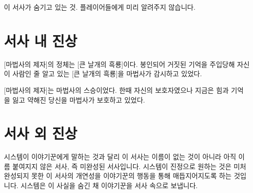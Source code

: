 \documentclass{report}
\begin{document}
이 서사가 숨기고 있는 것. 플레이어들에게 미리 알려주지 않습니다.

  \section{서사 내 진상}
    [마법사의 제자]의 정체는 [큰 날개의 흑룡]이다. 봉인되어 거짓된 기억을 주입당해 자신이 사람인 줄 알고 있는 [큰 날개의 흑룡]을 마법사가 감시하고 있었다.
    
    [마법사의 제자]는 마법사의 스승이었다. 한때 자신의 보호자였으나 지금은 힘과 기억을 잃고 약해진 당신을 마법사가 보호하고 있었다.

  \section{서사 외 진상}
    시스템이 이야기꾼에게 말하는 것과 달리 이 서사는 이름이 없는 것이 아니라 아직 이름 붙여지지 않은 서사, 즉 미완성된 서사입니다. 시스템이 진정으로 원하는 것은 미처 완성되지 못한 이 서사의 개연성을 이야기꾼의 행동을 통해 매듭지어지도록 하는 것입니다. 시스템은 이 사실을 숨긴 채 이야기꾼을 서사 속으로 보냅니다.
\end{document}
